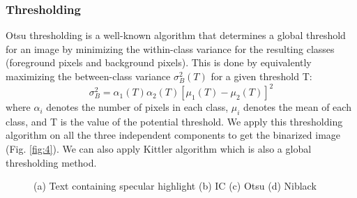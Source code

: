 \subsubsection{Thresholding}

Otsu thresholding \cite{A2} is a well-known algorithm that
determines a global threshold for an image by minimizing 
the within-class variance for the resulting classes (foreground pixels 
and background pixels). This is
done by equivalently maximizing the between-class variance
$\sigma _{B}^{2}(T)$ for a given threshold T:
\begin{equation}
\sigma_{B}^{2}=\alpha_1(T)\alpha_2(T)[\mu_1(T)-\mu_2(T)]^2 
\end{equation}
where $\alpha_i$ denotes the number of pixels in each class, $\mu_i$ denotes 
the mean of each class, and T is the value of the potential threshold. 
We apply this thresholding algorithm on all the three independent components to get the binarized image (Fig. \ref{fig:4}).
We can also apply Kittler \cite{A5} algorithm which is also a global thresholding method.
\begin{figure}[tp]
\centering
{}
\caption
{(a) Text containing specular highlight (b) IC (c) Otsu (d) Niblack}
\label{fig:5}
\end{figure}



